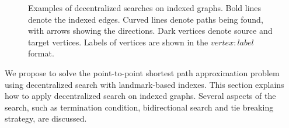 \begin{figure}[ht]
		\vspace{-0.7cm}
    \centering
    \caption{Examples of decentralized searches on indexed graphs. Bold lines denote the indexed edges. Curved lines denote paths being found, with arrows showing the directions. Dark vertices denote source and target vertices. Labels of vertices are shown in the $vertex:label$ format.}
\end{figure}

We propose to solve the point-to-point shortest path approximation problem using decentralized search with landmark-based indexes. This section explains how to apply decentralized search on indexed graphs. Several aspects of the search, such as termination condition, bidirectional search and tie breaking strategy, are discussed.

